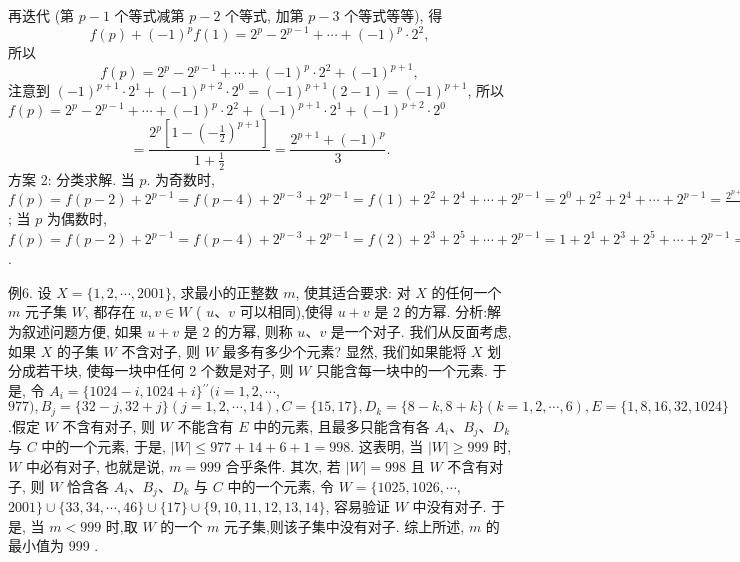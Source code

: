 再迭代 (第 $p-1$ 个等式减第 $p-2$ 个等式, 加第 $p-3$ 个等式等等), 得
$$
f(p)+(-1)^p f(1)=2^p-2^{p-1}+\cdots+(-1)^p \cdot 2^2,
$$
所以
$$
f(p)=2^p-2^{p-1}+\cdots+(-1)^p \cdot 2^2+(-1)^{p+1},
$$
注意到 $(-1)^{p+1} \cdot 2^1+(-1)^{p+2} \cdot 2^0=(-1)^{p+1}(2-1)=(-1)^{p+1}$,
所以 $f(p)=2^p-2^{p-1}+\cdots+(-1)^p \cdot 2^2+(-1)^{p+1} \cdot 2^1+(-1)^{p+2} \cdot 2^0$
$$
=\frac{2^p\left[1-\left(-\frac{1}{2}\right)^{p+1}\right]}{1+\frac{1}{2}}=\frac{2^{p+1}+(-1)^p}{3} .
$$
方案 2: 分类求解.
当 $p$. 为奇数时, $f(p)=f(p-2)+2^{p-1}=f(p-4)+2^{p-3}+2^{p-1}= f(1)+2^2+2^4+\cdots+2^{p-1}=2^0+2^2+2^4+\cdots+2^{p-1}=\frac{2^{p+1}-1}{3}$;
当 $p$ 为偶数时, $f(p)=f(p-2)+2^{p-1}=f(p-4)+2^{p-3}+2^{p-1}= f(2)+2^3+2^5+\cdots+2^{p-1}=1+2^1+2^3+2^5+\cdots+2^{p-1}=\frac{2^{p+1}+1}{3}$.



例6. 设 $X=\{1,2, \cdots, 2001\}$, 求最小的正整数 $m$, 使其适合要求: 对 $X$ 的任何一个 $m$ 元子集 $W$, 都存在 $u, v \in W$ ( $u 、 v$ 可以相同),使得 $u+v$ 是 2 的方幂.
分析:解为叙述问题方便, 如果 $u+v$ 是 2 的方幂, 则称 $u 、 v$ 是一个对子.
我们从反面考虑, 如果 $X$ 的子集 $W$ 不含对子, 则 $W$ 最多有多少个元素? 显然, 我们如果能将 $X$ 划分成若干块, 使每一块中任何 2 个数是对子, 则 $W$ 只能含每一块中的一个元素.
于是, 令 $A_i=\{1024-i, 1024+i\}{ }^{\prime \prime}(i=1,2, \cdots$, $977), B_j=\{32-j, 32+j\}(j=1,2, \cdots, 14), C=\{15,17\}, D_k=\{8- k, 8+k\}(k=1,2, \cdots, 6), E=\{1,8,16,32,1024\}$ .假定 $W$ 不含有对子, 则 $W$ 不能含有 $E$ 中的元素, 且最多只能含有各 $A_i 、 B_j 、 D_k$ 与 $C$ 中的一个元素, 于是, $|W| \leqslant 977+14+6+1=998$. 这表明, 当 $|W| \geqslant 999$ 时, $W$ 中必有对子, 也就是说, $m=999$ 合乎条件.
其次, 若 $|W|=998$ 且 $W$ 不含有对子, 则 $W$ 恰含各 $A_i 、 B_j 、 D_k$ 与 $C$ 中的一个元素, 令 $W=\{1025,1026, \cdots$, $2001\} \cup\{33,34, \cdots, 46\} \cup\{17\} \cup\{9,10,11,12,13,14\}$, 容易验证 $W$ 中没有对子.
于是, 当 $m<999$ 时,取 $W$ 的一个 $m$ 元子集,则该子集中没有对子.
综上所述, $m$ 的最小值为 999 .



